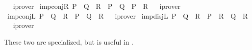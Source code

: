 \begin{isabellebody}
\isadelimproof
\ %
\endisadelimproof
%
\isatagproof
{}\isamarkupfalse%
\ iprover%
\endisatagproof
{\isafoldproof}%
%
\isadelimproof
%
\endisadelimproof
\isanewline
\isanewline
{}\isamarkupfalse%
\ imp{\isacharunderscore}{\kern0pt}conjR{\isacharcolon}{\kern0pt}\ {\isachardoublequoteopen}{\isacharparenleft}{\kern0pt}P\ {\isasymlongrightarrow}\ {\isacharparenleft}{\kern0pt}Q\ {\isasymand}\ R{\isacharparenright}{\kern0pt}{\isacharparenright}{\kern0pt}\ {\isacharequal}{\kern0pt}\ {\isacharparenleft}{\kern0pt}{\isacharparenleft}{\kern0pt}P\ {\isasymlongrightarrow}\ Q{\isacharparenright}{\kern0pt}\ {\isasymand}\ {\isacharparenleft}{\kern0pt}P\ {\isasymlongrightarrow}\ R{\isacharparenright}{\kern0pt}{\isacharparenright}{\kern0pt}{\isachardoublequoteclose}%
\isadelimproof
\ %
\endisadelimproof
%
\isatagproof
{}\isamarkupfalse%
\ iprover%
\endisatagproof
{\isafoldproof}%
%
\isadelimproof
%
\endisadelimproof
\isanewline
{}\isamarkupfalse%
\ imp{\isacharunderscore}{\kern0pt}conjL{\isacharcolon}{\kern0pt}\ {\isachardoublequoteopen}{\isacharparenleft}{\kern0pt}{\isacharparenleft}{\kern0pt}P\ {\isasymand}\ Q{\isacharparenright}{\kern0pt}\ {\isasymlongrightarrow}\ R{\isacharparenright}{\kern0pt}\ {\isacharequal}{\kern0pt}\ {\isacharparenleft}{\kern0pt}P\ {\isasymlongrightarrow}\ {\isacharparenleft}{\kern0pt}Q\ {\isasymlongrightarrow}\ R{\isacharparenright}{\kern0pt}{\isacharparenright}{\kern0pt}{\isachardoublequoteclose}%
\isadelimproof
\ %
\endisadelimproof
%
\isatagproof
{}\isamarkupfalse%
\ iprover%
\endisatagproof
{\isafoldproof}%
%
\isadelimproof
%
\endisadelimproof
\isanewline
{}\isamarkupfalse%
\ imp{\isacharunderscore}{\kern0pt}disjL{\isacharcolon}{\kern0pt}\ {\isachardoublequoteopen}{\isacharparenleft}{\kern0pt}{\isacharparenleft}{\kern0pt}P\ {\isasymor}\ Q{\isacharparenright}{\kern0pt}\ {\isasymlongrightarrow}\ R{\isacharparenright}{\kern0pt}\ {\isacharequal}{\kern0pt}\ {\isacharparenleft}{\kern0pt}{\isacharparenleft}{\kern0pt}P\ {\isasymlongrightarrow}\ R{\isacharparenright}{\kern0pt}\ {\isasymand}\ {\isacharparenleft}{\kern0pt}Q\ {\isasymlongrightarrow}\ R{\isacharparenright}{\kern0pt}{\isacharparenright}{\kern0pt}{\isachardoublequoteclose}%
\isadelimproof
\ %
\endisadelimproof
%
\isatagproof
{}\isamarkupfalse%
\ iprover%
\endisatagproof
{\isafoldproof}%
%
\isadelimproof
%
\endisadelimproof
%
\begin{isamarkuptext}%
These two are specialized, but  is useful in .%

\end{isamarkuptext}
\end{isabellebody}

